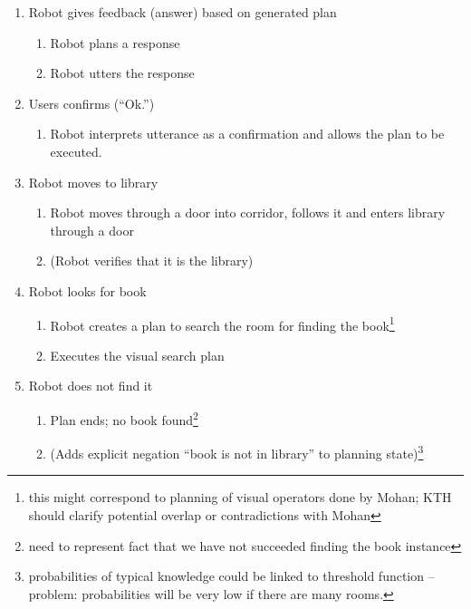 \documentclass{article}
\begin{document}
\begin{enumerate}
\begin{enumerate}
\begin{itemize}
		\end{itemize}
	\end{enumerate}

\item \label{lvl2:4} 
	Robot gives feedback (answer) based on generated plan
	\begin{enumerate}
	\item Robot plans a response
	\item Robot utters the response
	\end{enumerate}

\item \label{lvl2:5} 
	Users confirms (``Ok.'')
	\begin{enumerate}
	\item Robot interprets utterance as a confirmation and 
		allows the plan to be executed.
	\end{enumerate}
	
\item \label{lvl2:6} 
	Robot moves to library
	\begin{enumerate}
	\item Robot moves through a door into corridor, follows it and enters library through a door
	\item (Robot verifies that it is the library)
	\end{enumerate}

\item \label{vis_search_lib} \label{lvl2:7} Robot looks for book
	\begin{enumerate}
	\item Robot creates a plan to search the room for finding the 
		book\footnote{this might correspond to planning of visual operators done by Mohan;
			KTH should clarify potential overlap or contradictions with Mohan}
	\item Executes the visual search plan
	\end{enumerate}

\item \label{vis_search_lib_fail} \label{lvl2:8} Robot does not find it
	\begin{enumerate}
	\item Plan ends; no book found\footnote{need to represent fact that we have not
		succeeded finding the book instance}
	\item (Adds explicit negation ``book is not in library'' to planning 
		state)\footnote{probabilities of typical knowledge could be linked to threshold
		function -- problem: probabilities will be very low if there are many rooms.}
	\end{enumerate}
	

\end{enumerate}
\end{document}

